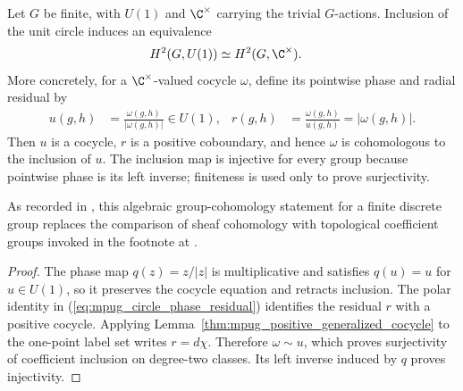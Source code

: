 \begin{lemma}
    \label{thm:mpug_circle_complex_units_h2}
    \leanok
    Let $G$ be finite, with $U(1)$ and $\C^\times$ carrying the trivial
    $G$-actions.  Inclusion of the unit circle induces an equivalence
    \begin{align}
        H^2(G,U(1))
         & \simeq H^2(G,\C^\times).
        \label{eq:mpug_circle_complex_units_h2}
    \end{align}
    More concretely, for a $\C^\times$-valued cocycle $\omega$, define its
    pointwise phase and radial residual by
    \begin{align}
        u(g,h)
         & =\frac{\omega(g,h)}{|\omega(g,h)|}\in U(1),
         &
        r(g,h)
         & =\frac{\omega(g,h)}{u(g,h)}=|\omega(g,h)|.
        \label{eq:mpug_circle_phase_residual}
    \end{align}
    Then $u$ is a cocycle, $r$ is a positive coboundary, and hence $\omega$
    is cohomologous to the inclusion of $u$.  The inclusion map is injective
    for every group because pointwise phase is its left inverse; finiteness is
    used only to prove surjectivity.

    As recorded in \cite{gap:fbc25_circle_complex_units_cohomology}, this
    algebraic group-cohomology statement for a finite discrete group replaces
    the comparison of sheaf cohomology with topological coefficient groups
    invoked in the footnote at
    \cite[line~1931]{FrancoRubio2025MPUGauging}.
\end{lemma}

\begin{proof}\leanok
    The phase map $q(z)=z/|z|$ is multiplicative and satisfies
    $q(u)=u$ for $u\in U(1)$, so it preserves the cocycle equation and
    retracts inclusion.  The polar identity in
    (\ref{eq:mpug_circle_phase_residual}) identifies the residual $r$ with a
    positive cocycle.  Applying
    Lemma~\ref{thm:mpug_positive_generalized_cocycle} to the one-point label
    set writes $r=d\chi$.  Therefore $\omega\sim u$, which proves
    surjectivity of coefficient inclusion on degree-two classes.  Its left
    inverse induced by $q$ proves injectivity.
\end{proof}
